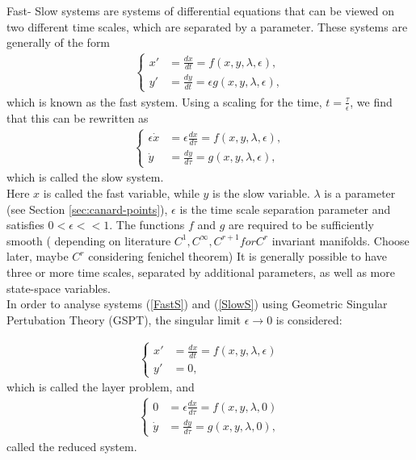 
Fast- Slow systems are systems of differential equations that can be viewed on two different time scales, which are separated by a parameter.
These systems are generally of the form
\begin{align} 
\begin{cases}
x' &=\frac{dx}{dt}= f(x,y,\lambda, \epsilon),\\
y' &= \frac{dy}{dt}= \epsilon g( x,y, \lambda, \epsilon),
\end{cases}\label{FastS}
\end{align}
which is known as the fast system.
Using a scaling for the time, $t = \frac{\tau}{\epsilon} $, we find that this can be rewritten as
\begin{align}
\begin{cases}
\epsilon \dot{x} &= \epsilon \frac{dx}{d \tau} = f(x,y,\lambda, \epsilon),\\
\dot{y} & = \frac{dy}{d \tau} =  g( x,y, \lambda, \epsilon),
\end{cases}\label{SlowS}
\end{align}
which is called the slow system.\\

Here $x$ is called the fast variable, while $y$ is the slow variable. $\lambda$ is a parameter (see Section \ref{sec:canard-points}), $\epsilon$ is the time scale separation parameter and satisfies $0< \epsilon << 1$. The functions $f$ and $g$ are required to be sufficiently smooth ( depending on literature $C^1, C^\infty, C^{r+1} for C^r$ invariant manifolds. Choose later, maybe $C^r$ considering fenichel theorem)
It is generally possible to have three or more time scales, separated by additional parameters, as well as more state-space variables. \\

In order to analyse systems (\ref{FastS}) and (\ref{SlowS}) using Geometric Singular Pertubation Theory (GSPT), the singular limit $\epsilon \to 0$ is considered:

\begin{align} \label{FastS0}
\begin{cases}
x' &=\frac{dx}{dt}= f(x,y,\lambda, \epsilon)\\
y' &= 0,
\end{cases}
\end{align}
which is called the layer problem, and
\begin{align}\label{SlowS0}
\begin{cases}
0 &= \epsilon \frac{dx}{d \tau} = f(x,y,\lambda, 0)\\
\dot{y} & = \frac{dy}{d \tau} =  g( x,y, \lambda,0),
\end{cases}
\end{align}
called the reduced system.\\

